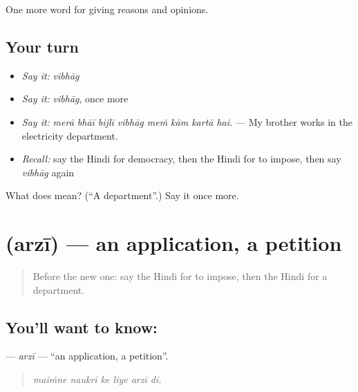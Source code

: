 \begin{grammarlens}[title={What you've built}]
One more word for giving reasons and opinions.
\end{grammarlens}

\subsection*{Your turn}
\begin{itemize}
\raggedright
  \item \emph{Say it:} \emph{vibhāg}
  \item \emph{Say it:} \emph{vibhāg}, once more
  \item \emph{Say it:} \emph{merā bhāī bijlī vibhāg meṁ kām kartā hai.} — My brother works in the electricity department.
  \item \emph{Recall:} say the Hindi for democracy, then the Hindi for to impose, then say \emph{vibhāg} again
\end{itemize}

\begin{tcolorbox}[breakable,colback=teal!4,colframe=teal!35!black,title={Before you move on}]
What does  mean? (\textquotedblleft{}A department\textquotedblright{}.) Say it once more.
\end{tcolorbox}
\section[\texorpdfstring{\hi{अर्ज़ी} (arzī)}{अर्ज़ी (arzī)}]{ (arzī) — an application, a petition}

\label{lesson:HI-C355-arzi}



\begin{quote}
Before the new one: say the Hindi for to impose, then the Hindi for a department.
\end{quote}

\subsection*{You'll want to know: }
\textbf{} — \emph{arzī} — \textquotedblleft{}an application, a petition\textquotedblright{}.

\begin{quote}
     
\end{quote}

\begin{quote}
\emph{maiṁne naukrī ke liye arzī dī.}
\end{quote}

